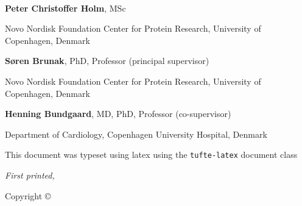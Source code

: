 \begin{@empty}
~\vfill
\thispagestyle{empty}
\setlength{\parindent}{0pt}
\setlength{\parskip}{\baselineskip}


\textbf{Peter Christoffer Holm}, MSc

Novo Nordisk Foundation Center for Protein Research,
University of Copenhagen, Denmark


\textbf{Søren Brunak}, PhD, Professor 
(principal supervisor)

Novo Nordisk Foundation Center for Protein Research, 
University of Copenhagen, Denmark

\textbf{Henning Bundgaard}, MD, PhD, Professor 
(co-supervisor)

Department of Cardiology,
Copenhagen University Hospital, Denmark

\par{}

\par This document was typeset using latex
using the \texttt{tufte-latex} document class

\par\textit{First printed, \monthyear}

Copyright \copyright\ \the\year\ \thanklessauthor
\end{@empty}
